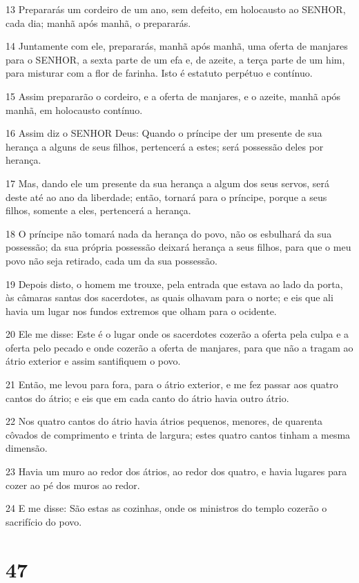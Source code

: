 \par 13 Prepararás um cordeiro de um ano, sem defeito, em holocausto ao SENHOR, cada dia; manhã após manhã, o prepararás.
\par 14 Juntamente com ele, prepararás, manhã após manhã, uma oferta de manjares para o SENHOR, a sexta parte de um efa e, de azeite, a terça parte de um him, para misturar com a flor de farinha. Isto é estatuto perpétuo e contínuo.
\par 15 Assim prepararão o cordeiro, e a oferta de manjares, e o azeite, manhã após manhã, em holocausto contínuo.
\par 16 Assim diz o SENHOR Deus: Quando o príncipe der um presente de sua herança a alguns de seus filhos, pertencerá a estes; será possessão deles por herança.
\par 17 Mas, dando ele um presente da sua herança a algum dos seus servos, será deste até ao ano da liberdade; então, tornará para o príncipe, porque a seus filhos, somente a eles, pertencerá a herança.
\par 18 O príncipe não tomará nada da herança do povo, não os esbulhará da sua possessão; da sua própria possessão deixará herança a seus filhos, para que o meu povo não seja retirado, cada um da sua possessão.
\par 19 Depois disto, o homem me trouxe, pela entrada que estava ao lado da porta, às câmaras santas dos sacerdotes, as quais olhavam para o norte; e eis que ali havia um lugar nos fundos extremos que olham para o ocidente.
\par 20 Ele me disse: Este é o lugar onde os sacerdotes cozerão a oferta pela culpa e a oferta pelo pecado e onde cozerão a oferta de manjares, para que não a tragam ao átrio exterior e assim santifiquem o povo.
\par 21 Então, me levou para fora, para o átrio exterior, e me fez passar aos quatro cantos do átrio; e eis que em cada canto do átrio havia outro átrio.
\par 22 Nos quatro cantos do átrio havia átrios pequenos, menores, de quarenta côvados de comprimento e trinta de largura; estes quatro cantos tinham a mesma dimensão.
\par 23 Havia um muro ao redor dos átrios, ao redor dos quatro, e havia lugares para cozer ao pé dos muros ao redor.
\par 24 E me disse: São estas as cozinhas, onde os ministros do templo cozerão o sacrifício do povo.

\chapter{47}

